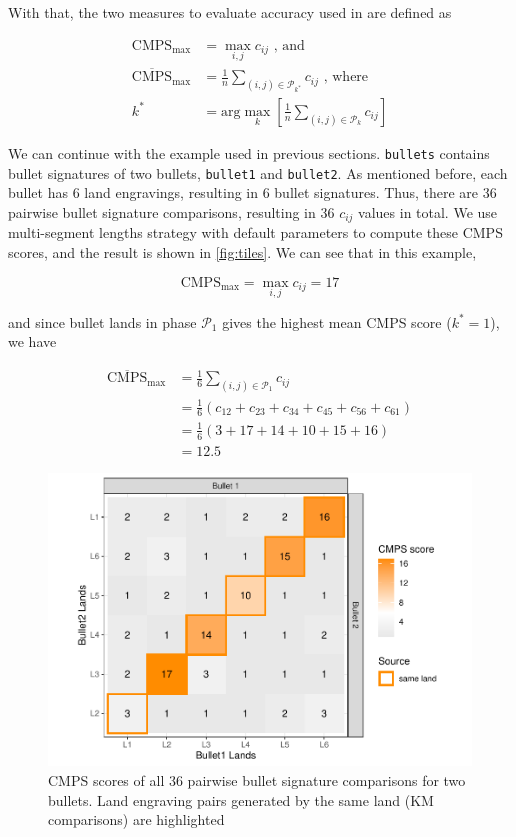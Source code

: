 With that, the two measures to evaluate accuracy used in \citet{cmps}
are defined as

\begin{align}
\mathrm{CMPS_{max}} &= \max_{i,j} c_{ij} \text{ , and} \\
\mathrm{\overline{CMPS}_{max}} &= \frac{1}{n} \sum_{(i,j) \in \mathcal{P}_{k^*}} c_{ij} \text{ , where} \\
k^* &= \text{arg}\max\limits_{k} \left[  \frac{1}{n} \sum_{(i,j) \in \mathcal{P}_k} c_{ij}\right]
\end{align}

We can continue with the example used in previous sections.
\texttt{bullets} contains bullet signatures of two bullets,
\texttt{bullet1} and \texttt{bullet2}. As mentioned before, each bullet
has 6 land engravings, resulting in 6 bullet signatures. Thus, there are
36 pairwise bullet signature comparisons, resulting in 36 \(c_{ij}\)
values in total. We use multi-segment lengths strategy with default
parameters to compute these CMPS scores, and the result is shown in
\autoref{fig:tiles}. We can see that in this example,

\[
\mathrm{CMPS_{max}} =  \max_{i,j} c_{ij} = 17
\]

and since bullet lands in phase \(\mathcal{P}_1\) gives the highest mean
CMPS score (\(k^* = 1\)), we have

\[
\begin{aligned}
\mathrm{\overline{CMPS}_{max}} &= \frac{1}{6} \sum_{(i,j) \in \mathcal{P}_1} c_{ij} \\
                        &= \frac{1}{6} (c_{12} + c_{23} + c_{34} + c_{45} + c_{56} + c_{61}) \\
                        &= \frac{1}{6} (3+17+14+10+15+16) \\
                        &= 12.5
\end{aligned}
\]

\begin{Schunk}
\begin{figure}

{\centering \includegraphics[width=.7\textwidth]{ju-hofmann_files/figure-latex/tiles-1} 

}

\caption[CMPS scores of all 36 pairwise bullet signature comparisons for two bullets]{CMPS scores of all 36 pairwise bullet signature comparisons for two bullets. Land engraving pairs generated by the same land (KM comparisons) are highlighted}\label{fig:tiles}
\end{figure}
\end{Schunk}

